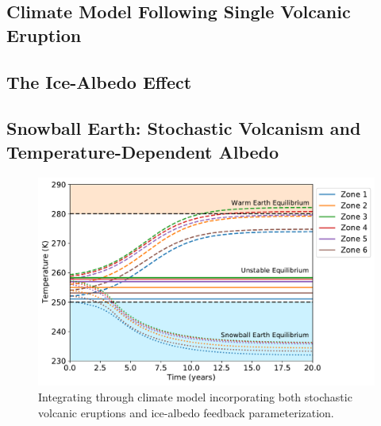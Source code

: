 \documentclass[12pt]{article}
\begin{document}
\subsection{Climate Model Following Single Volcanic Eruption}
\subsection{The Ice-Albedo Effect}
\subsection{Snowball Earth: Stochastic Volcanism and Temperature-Dependent Albedo}
\label{sec:snowballearth}



\begin{figure}[H]
    \centering
    \includegraphics[scale=0.6]{albedo_equilibria_1plot.pdf}
    \caption{
        Integrating through climate model incorporating both stochastic volcanic
        eruptions and ice-albedo feedback parameterization.
    }
    \label{fig:albedo_equil}
\end{figure}
\FloatBarrier
\end{document}
